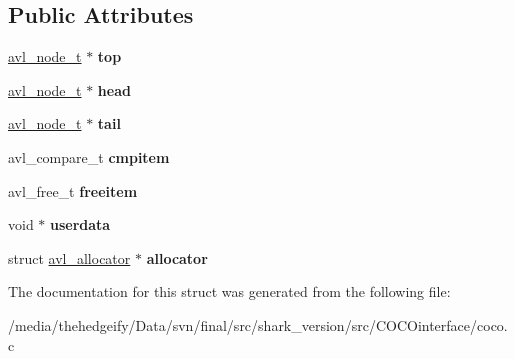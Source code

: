 \subsection*{Public Attributes}
\begin{DoxyCompactItemize}
\item 
\hyperlink{structavl__node}{avl\+\_\+node\+\_\+t} $\ast$ {\bfseries top}\hypertarget{structavl__tree_af955ce7bd9ac5c0791df7adb911ec4b3}{}\label{structavl__tree_af955ce7bd9ac5c0791df7adb911ec4b3}

\item 
\hyperlink{structavl__node}{avl\+\_\+node\+\_\+t} $\ast$ {\bfseries head}\hypertarget{structavl__tree_a6362738a5183a4249f82953140fd2558}{}\label{structavl__tree_a6362738a5183a4249f82953140fd2558}

\item 
\hyperlink{structavl__node}{avl\+\_\+node\+\_\+t} $\ast$ {\bfseries tail}\hypertarget{structavl__tree_a246eec1e4a599633da1c662bf1ead02d}{}\label{structavl__tree_a246eec1e4a599633da1c662bf1ead02d}

\item 
avl\+\_\+compare\+\_\+t {\bfseries cmpitem}\hypertarget{structavl__tree_a6ea1c3571d08e117af7e09ff238d5765}{}\label{structavl__tree_a6ea1c3571d08e117af7e09ff238d5765}

\item 
avl\+\_\+free\+\_\+t {\bfseries freeitem}\hypertarget{structavl__tree_afbe9682d6f735bc5844001cbb0e1627c}{}\label{structavl__tree_afbe9682d6f735bc5844001cbb0e1627c}

\item 
void $\ast$ {\bfseries userdata}\hypertarget{structavl__tree_a50766bee342bd20c4e0634d12076970e}{}\label{structavl__tree_a50766bee342bd20c4e0634d12076970e}

\item 
struct \hyperlink{structavl__allocator}{avl\+\_\+allocator} $\ast$ {\bfseries allocator}\hypertarget{structavl__tree_aadcfae0d0b0a7ddc0bb1eafe5868c053}{}\label{structavl__tree_aadcfae0d0b0a7ddc0bb1eafe5868c053}

\end{DoxyCompactItemize}


The documentation for this struct was generated from the following file\+:\begin{DoxyCompactItemize}
\item 
/media/thehedgeify/\+Data/svn/final/src/shark\+\_\+version/src/\+C\+O\+C\+Ointerface/coco.\+c\end{DoxyCompactItemize}
